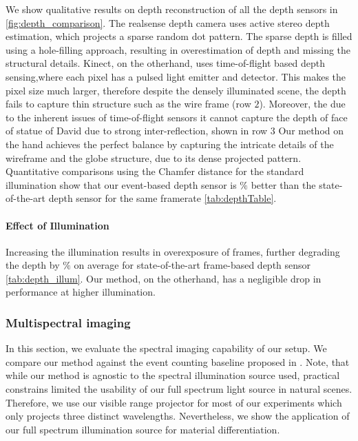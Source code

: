 

We show qualitative results on depth reconstruction of all the depth sensors in \Fig \ref{fig:depth_comparison}.
The realsense depth camera uses active stereo depth estimation, which projects a sparse random dot pattern.
The sparse depth is filled using a hole-filling approach, resulting in overestimation of depth and missing the structural details.
Kinect, on the otherhand, uses time-of-flight based depth sensing,where each pixel has a pulsed light emitter and detector. 
This makes the pixel size much larger, therefore despite the densely illuminated scene, the depth fails to capture thin structure such as the wire frame (row $2$).
Moreover, the due to the inherent issues of time-of-flight sensors it cannot capture the depth of face of statue of David due to strong inter-reflection, shown in row $3$ 
Our method on the hand achieves the perfect balance by capturing the intricate details of the wireframe and the globe structure, due to its dense projected pattern.
Quantitative comparisons using the Chamfer distance for the standard illumination show that our event-based depth sensor is $\%$ better than the state-of-the-art depth sensor for the same framerate \Tab \ref{tab:depthTable}.
\paragraph{Effect of Illumination}

Increasing the illumination results in overexposure of frames, further degrading the depth by $\%$ on average for state-of-the-art frame-based depth sensor \Tab \ref{tab:depth_illum}.
Our method, on the otherhand, has a negligible drop in performance at higher illumination.

\subsubsection{Multispectral imaging}
\label{sec:eval:color}
In this section, we evaluate the spectral imaging capability of our setup.
We compare our method against the event counting baseline proposed in \cite{RGBD}.
Note, that while our method is agnostic to the spectral illumination source used, practical constrains limited the usability of our full spectrum light source in natural scenes.
Therefore, we use our visible range projector for most of our experiments which only projects three distinct wavelengths.
Nevertheless, we show the application of our full spectrum illumination source for material differentiation.

